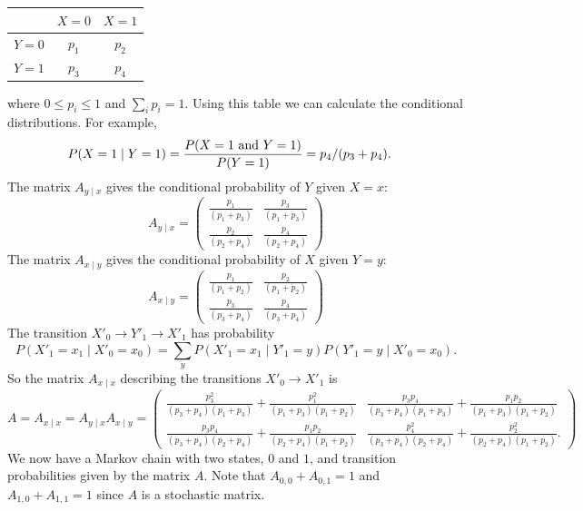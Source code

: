 \documentclass[12pt,amstags,fleqn]{article}
\theoremstyle{plain}
\theoremstyle{definition}
\theoremstyle{definition}
\begin{document}
\begin{center}  
\begin{tabular}{|c|c|c|}
\hline ~ & $X=0$ & $X=1$ \\
\hline $Y=0$ & $p_1$ & $p_2$ \\
\hline $Y=1$ & $p_3$ & $p_4$ \\
\hline
\end{tabular}
\end{center}
where $0 \leq p_i \leq 1$ and $\sum_i p_i = 1$. Using this table we can
calculate the conditional distributions. For example,
\begin{align*}
P(X = 1 \mid Y = 1) &= \frac{P(X = 1 \textnormal{ and } Y = 1)}{P(Y = 1)}
= p_4/(p_3 + p_4).
\end{align*}
The matrix $A_{y\mid x}$ gives the conditional probability of $Y$ given $X = x$:
\[
A_{y \mid x} = 
\left(\begin{array}{rr}
\frac{p_{1}}{{(p_{1} + p_{3})}} & \frac{p_{3}}{{(p_{1} + p_{3})}} \\
\frac{p_{2}}{{(p_{2} + p_{4})}} & \frac{p_{4}}{{(p_{2} + p_{4})}}
\end{array}\right)
\]
The matrix $A_{x\mid y}$ gives the conditional probability of $X$ given $Y = y$:
\[
A_{x \mid y} = 
\left(\begin{array}{rr}
\frac{p_{1}}{{(p_{1} + p_{2})}} & \frac{p_{2}}{{(p_{1} + p_{2})}} \\
\frac{p_{3}}{{(p_{3} + p_{4})}} & \frac{p_{4}}{{(p_{3} + p_{4})}}
\end{array}\right)
\]
The transition $X'_0 \rightarrow Y'_1 \rightarrow X'_1$ has probability
\[
P(X'_1 = x_1 \mid X'_0 = x_0)
= \sum_{y}P(X'_1 = x_1 \mid Y'_1 = y)
P(Y'_1 = y \mid X'_0 = x_0).
\]
So the matrix $A_{x\mid x}$ describing the transitions 
$X'_0 \rightarrow X'_1$ is
\[
A = A_{x\mid x} = A_{y \mid x} A_{x \mid y} = \left(\begin{array}{rr}
\frac{p_{3}^{2}}{{(p_{3} + p_{4})} {(p_{1} + p_{3})}} +
\frac{p_{1}^{2}}{{(p_{1} + p_{3})} {(p_{1} + p_{2})}} & \frac{p_{3}
p_{4}}{{(p_{3} + p_{4})} {(p_{1} + p_{3})}} + \frac{p_{1} p_{2}}{{(p_{1}
+ p_{3})} {(p_{1} + p_{2})}} \\
\frac{p_{3} p_{4}}{{(p_{3} + p_{4})} {(p_{2} + p_{4})}} + \frac{p_{1}
p_{2}}{{(p_{2} + p_{4})} {(p_{1} + p_{2})}} &
\frac{p_{4}^{2}}{{(p_{3} + p_{4})} {(p_{2} + p_{4})}} +
\frac{p_{2}^{2}}{{(p_{2} + p_{4})} {(p_{1} + p_{2})}}.
\end{array}\right)
\]
We now have a Markov chain with two states, $0$ and $1$, and transition
probabilities given by the matrix $A$. Note that
$A_{0,0} + A_{0,1} = 1$ and
$A_{1,0} + A_{1,1} = 1$ since $A$ is a stochastic matrix.
\end{document}
